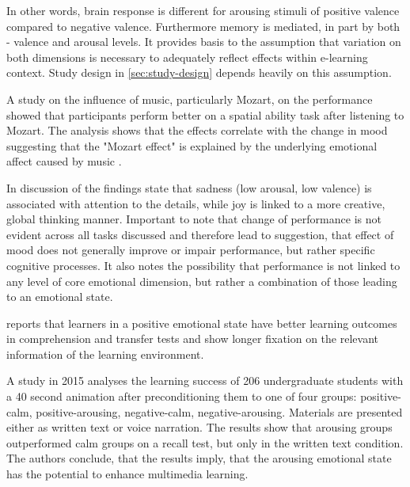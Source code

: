 		In other words, brain response is different for arousing stimuli of positive valence compared to negative valence. Furthermore memory is mediated, in part by both - valence and arousal levels. It provides basis to the assumption that variation on both dimensions is necessary to adequately reflect effects within e-learning context. Study design in \ref{sec:study-design} depends heavily on this assumption.	
				
		A study on the influence of music, particularly Mozart, on the performance showed that participants perform better on a spatial ability task after listening to Mozart. The analysis shows that the effects correlate with the change in mood suggesting that the "Mozart effect" is explained by the underlying emotional affect caused by music \cite{Thompson2001}.

		In discussion of the findings \cite{Jefferies2008} state that sadness (low arousal, low valence) is associated with attention to the details, while joy is linked to a more creative, global thinking manner. Important to note that change of performance is not evident across all tasks discussed and therefore lead to suggestion, that effect of mood does not generally improve or impair performance, but rather specific cognitive processes. It also notes the possibility that performance is not linked to any level of core emotional dimension, but rather a combination of those leading to an emotional state.
		
		\cite{Park2015} reports that learners in a positive emotional state have better learning outcomes in comprehension and transfer tests and show longer fixation on the relevant information of the learning environment.
		
		A study in 2015 analyses the learning success of 206 undergraduate students with a 40 second animation after preconditioning them to one of four groups: positive-calm, positive-arousing, negative-calm, negative-arousing. Materials are presented either as written text or voice narration. The results show that arousing groups outperformed calm groups on a recall test, but only in the written text condition. The authors conclude, that the results imply, that the arousing emotional state has the potential to enhance multimedia learning. \cite{Chung2015}

		
